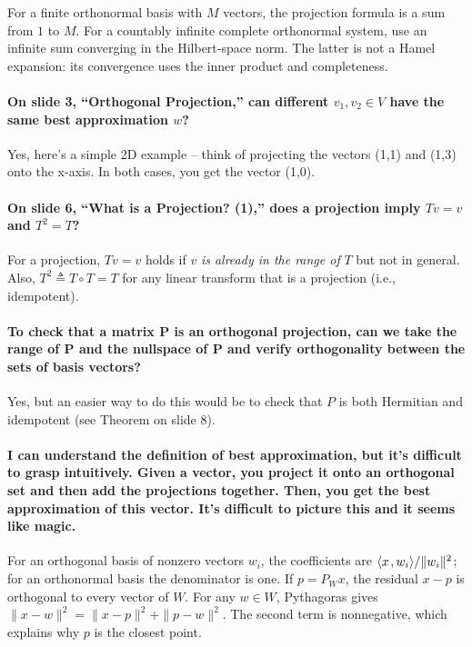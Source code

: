 \documentclass[10pt,english]{article}
\begin{document}
For a finite orthonormal basis with $M$ vectors, the projection formula is a sum from $1$ to $M$.
For a countably infinite complete orthonormal system, use an infinite sum converging in the Hilbert-space norm.
The latter is not a Hamel expansion: its convergence uses the inner product and completeness.


\paragraph{On slide 3, ``Orthogonal Projection,'' can different $v_1,v_2 \in V$ have the same best approximation $w$?}
Yes, here's a simple 2D example -- think of projecting the vectors (1,1) and (1,3) onto the x-axis. In both cases, you get the vector (1,0).

\paragraph{On slide 6, ``What is a Projection? (1),'' does a projection imply $Tv= v$ and $T^2=T$?}
For a projection, $Tv=v$ holds if $v$ \textit{is already in the range of} $T$ but not in general. Also, $T^2 \triangleq T \circ T = T$ for any linear transform that is a projection (i.e., idempotent).

\paragraph{To check that a matrix P is an orthogonal projection, can we take the range of P and the nullspace of P and verify orthogonality between the sets of basis vectors?}
Yes, but an easier way to do this would be to check that $P$ is both Hermitian and idempotent (see Theorem on slide 8).

\paragraph{I can understand the definition of best approximation, but it's difficult to grasp intuitively. Given a vector, you project it onto an orthogonal set and then add the projections together.  Then, you get the best approximation of this vector. It's difficult to picture this and it seems like magic. }

For an orthogonal basis of nonzero vectors $w_i$, the coefficients are ${\left\langle x \mskip2mu , w_i \right\rangle}/\|w_i\|^2$; for an orthonormal basis the denominator is one.
If $p=P_W x$, the residual $x-p$ is orthogonal to every vector of $W$.
For any $w\in W$, Pythagoras gives $\|x-w\|^2=\|x-p\|^2+\|p-w\|^2$.
The second term is nonnegative, which explains why $p$ is the closest point.
\end{document}
